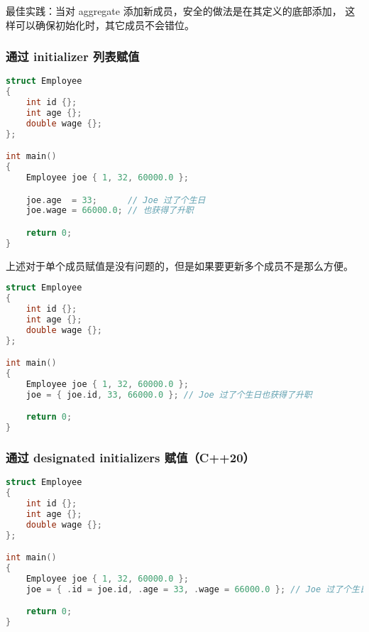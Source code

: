 \documentclass[../../LearnCpp.tex]{subfiles}
\begin{document}
最佳实践：当对 aggregate 添加新成员，安全的做法是在其定义的底部添加，
这样可以确保初始化时，其它成员不会错位。

\subsubsection*{通过 initializer 列表赋值}

\begin{lstlisting}[language=C++]
struct Employee
{
    int id {};
    int age {};
    double wage {};
};

int main()
{
    Employee joe { 1, 32, 60000.0 };

    joe.age  = 33;      // Joe 过了个生日
    joe.wage = 66000.0; // 也获得了升职

    return 0;
}
\end{lstlisting}

上述对于单个成员赋值是没有问题的，但是如果要更新多个成员不是那么方便。

\begin{lstlisting}[language=C++]
struct Employee
{
    int id {};
    int age {};
    double wage {};
};

int main()
{
    Employee joe { 1, 32, 60000.0 };
    joe = { joe.id, 33, 66000.0 }; // Joe 过了个生日也获得了升职

    return 0;
}
\end{lstlisting}

\subsubsection*{通过 designated initializers 赋值（C++20）}

\begin{lstlisting}[language=C++]
struct Employee
{
    int id {};
    int age {};
    double wage {};
};

int main()
{
    Employee joe { 1, 32, 60000.0 };
    joe = { .id = joe.id, .age = 33, .wage = 66000.0 }; // Joe 过了个生日也获得了升职

    return 0;
}
\end{lstlisting}
\end{document}
